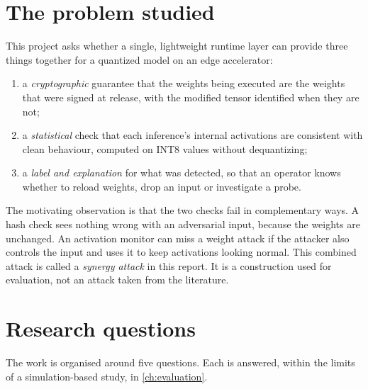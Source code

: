 \section{The problem studied}

This project asks whether a single, lightweight runtime layer can provide three things together
for a quantized model on an edge accelerator:

\begin{enumerate}[label=(\roman*),leftmargin=*]
  \item a \emph{cryptographic} guarantee that the weights being executed are the weights that
        were signed at release, with the modified tensor identified when they are not;
  \item a \emph{statistical} check that each inference's internal activations are consistent
        with clean behaviour, computed on INT8 values without dequantizing;
  \item a \emph{label and explanation} for what was detected, so that an operator knows
        whether to reload weights, drop an input or investigate a probe.
\end{enumerate}

The motivating observation is that the two checks fail in complementary ways. A hash check
sees nothing wrong with an adversarial input, because the weights are unchanged. An activation
monitor can miss a weight attack if the attacker also controls the input and uses it to keep
activations looking normal. This combined attack is called a \emph{synergy attack} in this
report. It is a construction used for evaluation, not an attack taken from the literature.

\section{Research questions}

The work is organised around five questions. Each is answered, within the limits of a
simulation-based study, in \cref{ch:evaluation}.

